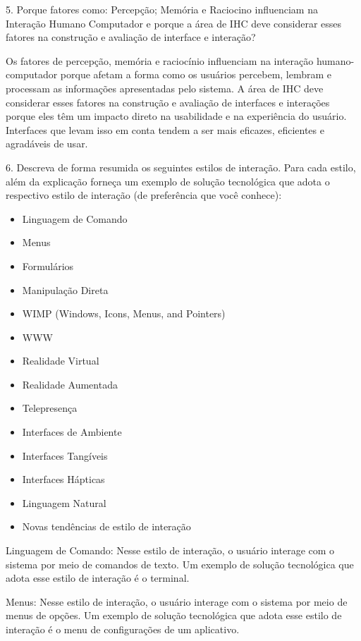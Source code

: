 \documentclass[12pt,a4paper]{article}
\begin{document}
\vspace{1cm}

5. Porque fatores como: Percepção; Memória e Raciocino influenciam na Interação Humano Computador e porque a área de IHC deve considerar esses fatores na construção e avaliação de
interface e interação?

Os fatores de percepção, memória e raciocínio influenciam na interação humano-computador porque afetam a forma como os usuários percebem, lembram e processam as informações apresentadas pelo sistema. A área de IHC deve considerar esses fatores na construção e avaliação de interfaces e interações porque eles têm um impacto direto na usabilidade e na experiência do usuário. Interfaces que levam isso em conta tendem a ser mais eficazes, eficientes e agradáveis de usar.

\vspace{1cm}

6. Descreva de forma resumida os seguintes estilos de interação. Para cada estilo, além da explicação forneça um exemplo de solução tecnológica que adota o respectivo estilo de interação (de preferência que você conhece):
\begin{itemize}
    \item Linguagem de Comando
    \item Menus
    \item Formulários
    \item Manipulação Direta
    \item WIMP (Windows, Icons, Menus, and Pointers)
    \item WWW
    \item Realidade Virtual
    \item Realidade Aumentada
    \item Telepresença
    \item Interfaces de Ambiente
    \item Interfaces Tangíveis
    \item Interfaces Hápticas
    \item Linguagem Natural
    \item Novas tendências de estilo de interação
\end{itemize}

Linguagem de Comando: Nesse estilo de interação, o usuário interage com o sistema por meio de comandos de texto. Um exemplo de solução tecnológica que adota esse estilo de interação é o terminal.

Menus: Nesse estilo de interação, o usuário interage com o sistema por meio de menus de opções. Um exemplo de solução tecnológica que adota esse estilo de interação é o menu de configurações de um aplicativo.
\end{document}
